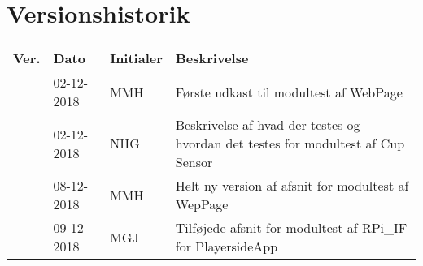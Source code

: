 \documentclass[Modultest/Modultest_main.tex]{subfiles}
\begin{document}
\section{Versionshistorik}
\begin{longtable}{|L{0.07\textwidth}|L{0.15\textwidth}|L{0.13\textwidth}|L{0.55\textwidth}|}
        \hline
        \textbf{Ver.} & \textbf{Dato} & \textbf{Initialer} & \textbf{Beskrivelse}  \\ \hline
        & 02-12-2018 & MMH & Første udkast til modultest af WebPage \\ \hline
        & 02-12-2018 & NHG & Beskrivelse af hvad der testes og hvordan det testes for modultest af Cup Sensor \\ \hline
         & 08-12-2018 & MMH & Helt ny version af afsnit for modultest af WepPage \\ \hline
         & 09-12-2018 & MGJ & Tilføjede afsnit for modultest af RPi\_IF for PlayersideApp \\ \hline
\end{longtable}
\end{document}
